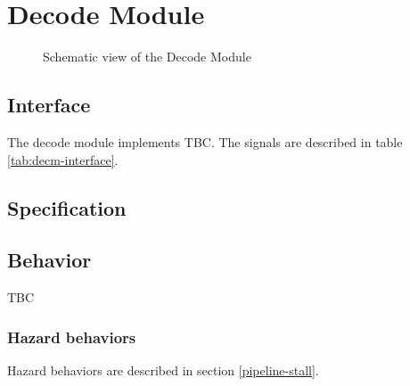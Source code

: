 \section{Decode Module}

\begin{figure}[h!]
    \centering
    
    \caption{Schematic view of the Decode Module}
    \label{fig:decm}
\end{figure}

\subsection{Interface}

\begin{content}
The decode module implements TBC. The signals are described in table \ref{tab:decm-interface}. 
\end{content}



\subsection{Specification}

\subsection{Behavior}

\begin{content}
  TBC
\end{content}

\subsubsection{Hazard behaviors}

\begin{content}
  Hazard behaviors are described in section \ref{pipeline-stall}.
\end{content}

\newpage